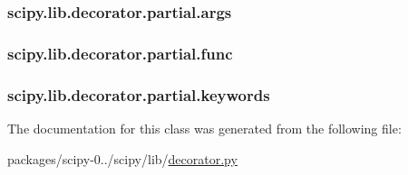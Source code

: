 \subsubsection[{args}]{\setlength{\rightskip}{0pt plus 5cm}scipy.\+lib.\+decorator.\+partial.\+args}\label{classscipy_1_1lib_1_1decorator_1_1partial_a185fbad28f16c6a13f4cd08a33aa18ec}
\hypertarget{classscipy_1_1lib_1_1decorator_1_1partial_a17d5cf4a6a50e6caed60cb116f08720d}{}
\subsubsection[{func}]{\setlength{\rightskip}{0pt plus 5cm}scipy.\+lib.\+decorator.\+partial.\+func}\label{classscipy_1_1lib_1_1decorator_1_1partial_a17d5cf4a6a50e6caed60cb116f08720d}
\hypertarget{classscipy_1_1lib_1_1decorator_1_1partial_a76fcec6a94e94edf219ad4114a2f067e}{}
\subsubsection[{keywords}]{\setlength{\rightskip}{0pt plus 5cm}scipy.\+lib.\+decorator.\+partial.\+keywords}\label{classscipy_1_1lib_1_1decorator_1_1partial_a76fcec6a94e94edf219ad4114a2f067e}


The documentation for this class was generated from the following file\+:\begin{DoxyCompactItemize}
\item 
packages/scipy-\/0../scipy/lib/\hyperlink{decorator_8py}{decorator.\+py}\end{DoxyCompactItemize}
